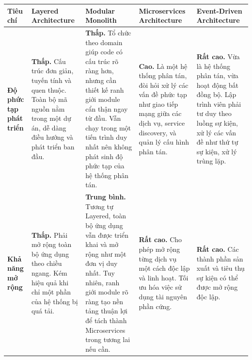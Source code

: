 
\clearpage
\begin{landscape}
    \begin{table}[h!]
        \centering
        \setlength{\tabcolsep}{4pt}
        \footnotesize
        \begin{tabularx}{\linewidth}{|l|X|X|X|X|}
            \hline
            \textbf{Tiêu chí}                       & \textbf{Layered Architecture}                                                                                                                                     & \textbf{Modular Monolith}                                                                                                                                                                                                                   & \textbf{Microservices Architecture}                                                                                                                             & \textbf{Event-Driven Architecture}                                                                                                                                          \\
            \hline
            \textbf{Độ phức tạp phát triển}         & \textbf{Thấp.} Cấu trúc đơn giản, tuyến tính và quen thuộc. Toàn bộ mã nguồn nằm trong một dự án, dễ dàng điều hướng và phát triển ban đầu.                       & \textbf{Thấp.} Tổ chức theo domain giúp code có cấu trúc rõ ràng hơn, nhưng cần thiết kế ranh giới module cẩn thận ngay từ đầu. Vẫn chạy trong một tiến trình duy nhất nên không phát sinh độ phức tạp của hệ thống phân tán.               & \textbf{Cao.} Là một hệ thống phân tán, đòi hỏi xử lý các vấn đề phức tạp như giao tiếp mạng giữa các dịch vụ, service discovery, và quản lý cấu hình phân tán. & \textbf{Rất cao.} Vừa là hệ thống phân tán, vừa hoạt động bất đồng bộ. Lập trình viên phải tư duy theo luồng sự kiện, xử lý các vấn đề như thứ tự sự kiện, xử lý trùng lặp. \\
            \hline
            \textbf{Khả năng mở rộng}               & \textbf{Thấp.} Phải mở rộng toàn bộ ứng dụng theo chiều ngang. Kém hiệu quả khi chỉ một phần của hệ thống bị quá tải.                                             & \textbf{Trung bình.} Tương tự Layered, toàn bộ ứng dụng vẫn được triển khai và mở rộng như một đơn vị duy nhất. Tuy nhiên, ranh giới module rõ ràng tạo nền tảng thuận lợi để tách thành Microservices trong tương lai nếu cần.             & \textbf{Rất cao.} Cho phép mở rộng từng dịch vụ một cách độc lập và linh hoạt. Tối ưu hóa việc sử dụng tài nguyên phần cứng.                                    & \textbf{Rất cao.} Các thành phần sản xuất và tiêu thụ sự kiện có thể được mở rộng độc lập.                                                                                  \\

\end{tabularx}
\end{table}
\end{landscape}
